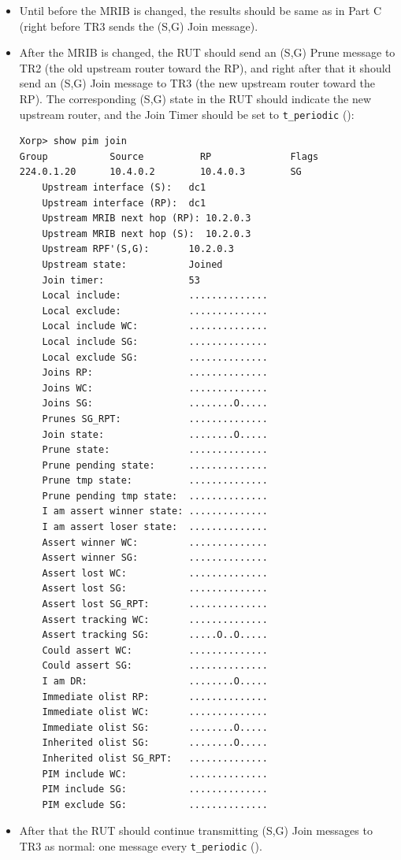 \documentclass[11pt]{report}
\begin{document}
\begin{itemize}

  \item Until before the MRIB is changed, the results should
  be same as in Part C (right before TR3 sends the (S,G) Join message).

  \item After the MRIB is changed, the RUT should send an (S,G) Prune
  message to TR2 (the old upstream router toward the RP), and right after that
  it should send an (S,G) Join message to TR3 (the new upstream router
  toward the RP). The corresponding (S,G) state in the RUT should
  indicate the new upstream router, and the Join Timer should be set
  to \verb=t_periodic= ({\PimsmTPeriodic}):

\begin{verbatim}
Xorp> show pim join 
Group           Source          RP              Flags
224.0.1.20      10.4.0.2        10.4.0.3        SG   
    Upstream interface (S):   dc1
    Upstream interface (RP):  dc1
    Upstream MRIB next hop (RP): 10.2.0.3
    Upstream MRIB next hop (S):  10.2.0.3
    Upstream RPF'(S,G):       10.2.0.3
    Upstream state:           Joined 
    Join timer:               53
    Local include:            ..............
    Local exclude:            ..............
    Local include WC:         ..............
    Local include SG:         ..............
    Local exclude SG:         ..............
    Joins RP:                 ..............
    Joins WC:                 ..............
    Joins SG:                 ........O.....
    Prunes SG_RPT:            ..............
    Join state:               ........O.....
    Prune state:              ..............
    Prune pending state:      ..............
    Prune tmp state:          ..............
    Prune pending tmp state:  ..............
    I am assert winner state: ..............
    I am assert loser state:  ..............
    Assert winner WC:         ..............
    Assert winner SG:         ..............
    Assert lost WC:           ..............
    Assert lost SG:           ..............
    Assert lost SG_RPT:       ..............
    Assert tracking WC:       ..............
    Assert tracking SG:       .....O..O.....
    Could assert WC:          ..............
    Could assert SG:          ..............
    I am DR:                  ........O.....
    Immediate olist RP:       ..............
    Immediate olist WC:       ..............
    Immediate olist SG:       ........O.....
    Inherited olist SG:       ........O.....
    Inherited olist SG_RPT:   ..............
    PIM include WC:           ..............
    PIM include SG:           ..............
    PIM exclude SG:           ..............
\end{verbatim}

  \item After that the RUT should continue transmitting 
  (S,G) Join messages to TR3 as normal: one message every \verb=t_periodic=
  ({\PimsmTPeriodic}).

\end{itemize}
\end{document}

